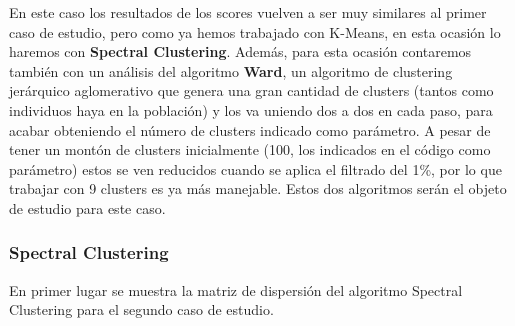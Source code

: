 	\begin{table}[H]
		\centering
		\caption{Resultados de los algoritmos de clustering para el segundo caso de estudio.}
	\end{table}

	En este caso los resultados de los scores vuelven a ser muy similares al primer caso de estudio, pero como ya hemos trabajado con K-Means, en esta ocasión lo haremos con \textbf{Spectral Clustering}. Además, para esta ocasión contaremos también con un análisis del algoritmo \textbf{Ward}, un algoritmo de clustering jerárquico aglomerativo que genera una gran cantidad de clusters (tantos como individuos haya en la población) y los va uniendo dos a dos en cada paso, para acabar obteniendo el número de clusters indicado como parámetro. A pesar de tener un montón de clusters inicialmente (100, los indicados en el código como parámetro) estos se ven reducidos cuando se aplica el filtrado del 1\%, por lo que trabajar con 9 clusters es ya más manejable. Estos dos algoritmos serán el objeto de estudio para este caso.
	
	\subsubsection{Spectral Clustering}
	En primer lugar se muestra la matriz de dispersión del algoritmo Spectral Clustering para el segundo caso de estudio.
	
